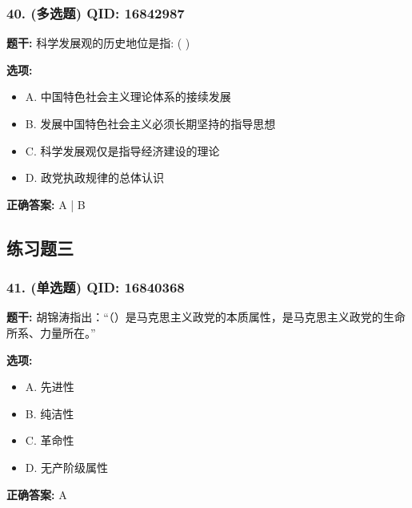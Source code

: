 \documentclass[12pt,UTF8]{ctexart}
\begin{document}
\subsubsection*{40. (多选题) \small QID: 16842987}

\textbf{题干:}
科学发展观的历史地位是指: ( )

\textbf{选项:}
\begin{itemize}[leftmargin=*]

  \item A. 中国特色社会主义理论体系的接续发展

  \item B. 发展中国特色社会主义必须长期坚持的指导思想

  \item C. 科学发展观仅是指导经济建设的理论

  \item D. 政党执政规律的总体认识

\end{itemize}

\textbf{正确答案:}
A | B

\vspace{0.3em}\hrulefill\vspace{0.7em}

\subsection*{练习题三}

\subsubsection*{41. (单选题) \small QID: 16840368}

\textbf{题干:}
胡锦涛指出：“（）是马克思主义政党的本质属性，是马克思主义政党的生命所系、力量所在。”

\textbf{选项:}
\begin{itemize}[leftmargin=*]

  \item A. 先进性

  \item B. 纯洁性

  \item C. 革命性

  \item D. 无产阶级属性

\end{itemize}

\textbf{正确答案:}
A

\vspace{0.3em}\hrulefill\vspace{0.7em}
\end{document}

